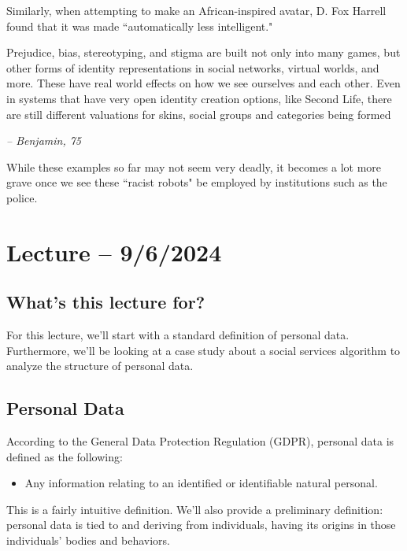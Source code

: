 \documentclass[openany]{book}
\begin{document}
Similarly, when attempting to make an African-inspired avatar, D. Fox Harrell found that it was made ``automatically less intelligent."

\begin{fancyquotes}
	Prejudice, bias, stereotyping, and stigma are built not only into many games, but other forms of identity representations in social networks, virtual worlds, and more. These have real world effects on how we see ourselves and each other. Even in systems that have very open identity creation options, like Second Life, there are still different valuations for skins, social groups and categories being formed
	
	\begin{flushright}
		\emph{\textit{-- Benjamin, 75}}
	\end{flushright}
\end{fancyquotes}

While these examples so far may not seem very deadly, it becomes a lot more grave once we see these ``racist robots" be employed by institutions such as the police.

\section{Lecture -- 9/6/2024}
\subsection{What's this lecture for?}
For this lecture, we'll start with a standard definition of personal data. Furthermore, we'll be looking at a case study about a social services algorithm to analyze the structure of personal data.

\subsection{Personal Data}
\begin{defn}
	According to the General Data Protection Regulation (GDPR), personal data is defined as the following:
	\begin{itemize}
		\item Any information relating to an identified or identifiable natural personal.
	\end{itemize}
\end{defn}

This is a fairly intuitive definition. We'll also provide a preliminary definition: personal data is tied to and deriving from individuals, having its origins in those individuals' bodies and behaviors.
\end{document}

